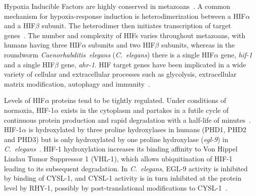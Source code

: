 \documentclass[9pt,twocolumn,twoside]{pnas-new}
\newcommand{\cel}{\emph{C.~elegans}}
\newcommand{\egl}{\emph{egl-9}}
\newcommand{\rhy}{\emph{rhy-1}}
\newcommand{\hif}{\emph{hif-1}}
\newcommand{\eglp}{EGL-9}
\newcommand{\rhyp}{RHY-1}
\newcommand{\vhlp}{VHL-1}
\newcommand{\hifp}{HIF-1}
\newcommand{\cyslp}{CYSL-1}
\begin{document}
Hypoxia Inducible Factors are highly conserved in metazoans~\cite{}. A common
mechanism for hypoxia-response induction is heterodimerization between a
HIF$\alpha$ and a HIF$\beta$ subunit. The heterodimer then initiates
transcription of target genes~\cite{}. The number and complexity of HIFs varies
throughout metazoans, with humans having three HIF$\alpha$ subunits and two
HIF$\beta$ subunits, whereas in the roundworm \emph{Caenorhabditis~elegans}
(\cel{}) there is a single HIF$\alpha$ gene, \hif{} and a single HIF$\beta$
gene, \emph{ahr-1}. HIF target genes have been implicated in a wide variety of
cellular and extracellular processes such as glycolysis, extracellular matrix
modification, autophagy and immunity~\cite{}.

Levels of HIF$\alpha$ proteins tend to be tightly regulated. Under conditions of
normoxia, \hifp{}$\alpha$ exists in the cytoplasm and partakes in a futile cycle
of continuous protein production and rapid degradation with a half-life of
minutes~\cite{}. \hifp{}$\alpha$ is hydroxylated by three proline hydroxylases
in humans (PHD1, PHD2 and PHD3) but is only hydroxylated by one proline
hydroxylase (\egl{}) in \cel{}~\cite{}. \hifp{} hydroxylation increases its
binding affinity to Von Hippel Lindau Tumor Suppressor 1 (\vhlp{}), which allows
ubiquitination of \hifp{} leading to its subsequent degradation. In \cel{},
\eglp{} activity is inhibited by binding of \cyslp{}, and \cyslp{} activity is
in turn inhibited at the protein level by \rhyp{}, possibly by
post-translational modifications to \cyslp{}~\cite{Ma2012}.
\end{document}
